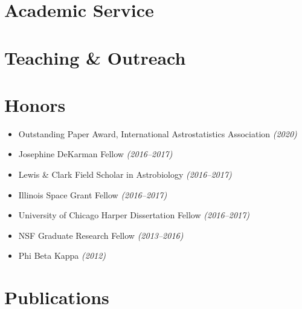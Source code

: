 \documentclass{clean_cv}
\begin{document}
\section{Academic Service}

\section{Teaching \& Outreach}


\section{Honors}

\begin{itemize}
    \item Outstanding Paper Award, International Astrostatistics Association \textit{(2020)}
    \item Josephine DeKarman Fellow \textit{(2016--2017)}
    \item Lewis \& Clark Field Scholar in Astrobiology \textit{(2016--2017)}
    \item Illinois Space Grant Fellow \textit{(2016--2017)}
    \item University of Chicago Harper Dissertation Fellow \textit{(2016--2017)}
    \item NSF Graduate Research Fellow \textit{(2013--2016)}
    \item Phi Beta Kappa \textit{(2012)}
\end{itemize}

\section{Publications}
\nocite{*} %
\begin{datetabular}{2em}

\end{datetabular}
\end{document}
